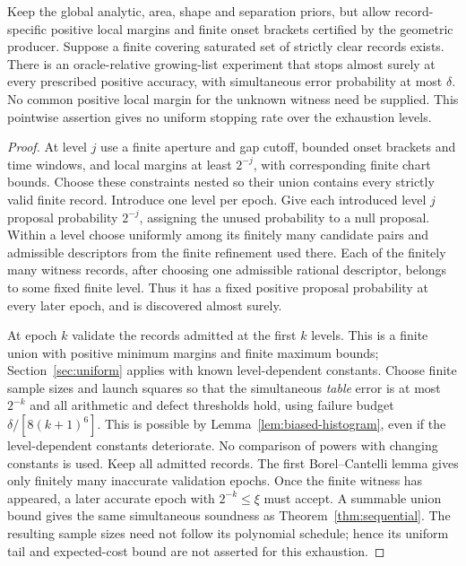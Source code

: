 \begin{proposition}
\label{prop:exhaustion}
Keep the global analytic, area, shape and separation priors, but allow
record-specific positive local margins and finite onset brackets certified
by the geometric producer. Suppose a finite covering saturated set of
strictly clear records exists. There is an oracle-relative growing-list
experiment that stops almost surely at every prescribed positive accuracy,
with simultaneous error probability at most $\delta$. No common positive
local margin for the unknown witness need be supplied. This pointwise
assertion gives no uniform stopping rate over the exhaustion levels.
\end{proposition}
\begin{proof}
At level $j$ use a finite aperture and gap cutoff, bounded onset brackets
and time windows, and local margins at least $2^{-j}$, with corresponding
finite chart bounds. Choose these constraints nested so their union
contains every strictly valid finite record. Introduce one level per epoch.
Give each introduced level $j$ proposal probability $2^{-j}$, assigning
the unused probability to a null proposal. Within a level choose uniformly
among its finitely many candidate pairs and admissible descriptors from
the finite refinement used there. Each of the finitely many witness
records, after choosing one admissible rational descriptor, belongs to
some fixed finite level. Thus it has a fixed positive proposal probability
at every later epoch, and is discovered almost surely.

At epoch $k$ validate the records admitted at the first $k$ levels. This
is a finite union with positive minimum margins and finite maximum bounds;
Section~\ref{sec:uniform} applies with known level-dependent constants.
Choose finite sample sizes and launch squares so that the simultaneous
\emph{table} error is at most $2^{-k}$ and all arithmetic and defect
thresholds hold, using failure budget $\delta/[8(k+1)^6]$. This is
possible by Lemma~\ref{lem:biased-histogram}, even if the level-dependent
constants deteriorate. No comparison of powers with changing constants
is used. Keep all admitted records. The first Borel--Cantelli lemma gives
only finitely many inaccurate validation epochs. Once the finite witness
has appeared, a later accurate epoch with $2^{-k}\le\xi$ must accept.
A summable union bound gives the same simultaneous soundness as
Theorem~\ref{thm:sequential}. The resulting sample sizes need not follow
its polynomial schedule; hence its uniform tail and expected-cost bound
are not asserted for this exhaustion.
\end{proof}

